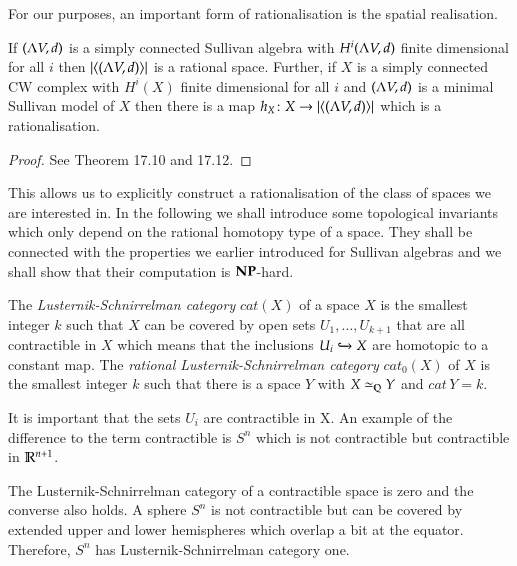 For our purposes, an important form of rationalisation is the spatial realisation.

\begin{Theorem}
 If $(\Lambda V,d)$ is a simply connected Sullivan algebra with $H^i (\Lambda V,d)$ finite dimensional for all $i$ then
 $| \langle (\Lambda V,d) \rangle |$ is a rational space. Further, if $X$ is a simply connected CW complex with 
 $H^i(X)$ finite dimensional for all $i$ and $(\Lambda V,d)$ is a minimal Sullivan model of $X$ then there is 
 a map $h_X \colon X \to | \langle (\Lambda V,d) \rangle |$ which is a rationalisation.
\end{Theorem}

\begin{proof}
 See \cite{Felix2001} Theorem 17.10 and 17.12.
\end{proof}


This allows us to explicitly construct a rationalisation of the class of spaces we are interested in.
In the following we shall introduce some topological invariants which only depend on the rational homotopy type of a
space. They shall be connected with the properties we earlier introduced for Sullivan algebras and we shall
show that their computation is $\mathbf{NP}$-hard.
\begin{Definition}
 The \emph{Lusternik-Schnirrelman category} $cat(X)$ of a space $X$ is the smallest integer $k$ such that 
 $X$ can be covered by open sets $U_1, \ldots, U_{k+1}$ that are all contractible in $X$ which
 means that the inclusions $U_i \xhookrightarrow{} X$ are homotopic to a constant map.
 The \emph{rational Lusternik-Schnirrelman category} $cat_0(X)$ of $X$ is the smallest integer $k$ such that there is a space $Y$
 with $ X \simeq_{\mathbb{Q}} Y$ and $cat \, Y = k$.
\end{Definition}

\begin{Remark}
 It is important that the sets $U_i$ are contractible in X. 
 An example of the difference to the term contractible is $S^n$ which is not contractible but contractible in $\mathbb{R}^{n+1}$. 
\end{Remark}

\begin{Example}
 The Lusternik-Schnirrelman category of a contractible space is zero and the converse also holds.
 A sphere $S^n$ is not contractible but can be covered by extended upper and lower hemispheres which
 overlap a  bit at the equator. Therefore, $S^n$ has Lusternik-Schnirrelman category one.
\end{Example}

